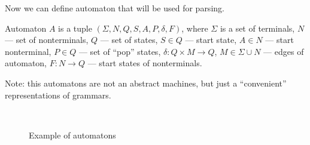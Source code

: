 \documentclass[runningheads,a4paper]{llncs}
\begin{document}
Now we can define automaton that will be used for parsing.

\begin{mydef}
Automaton $A$ is a tuple $(\Sigma, N, Q, S, A, P, \delta, F)$, where
$\Sigma$ is a set of terminals,
$N$ --- set of nonterminals,
$Q$ --- set of states,
$S \in Q$ --- start state,
$A \in N$ --- start nonterminal,
$P \in Q$ --- set of ``pop'' states,
$\delta : Q \times M \to Q$, 
$M \in \Sigma \cup N$ --- edges of automaton,
$F : N \to Q$ --- start states of nonterminals.
\end{mydef}

Note: this automatons are not an abstract machines, but just a ``convenient'' representations of grammars.

\begin{figure}
    \centering
    ~
    ~
    \caption{Example of automatons}
    \label{fig:fig1}
\end{figure}
\end{document}
